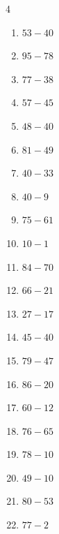 \begin{multicols}{4}
\begin{enumerate}
  \item $53-40$
        \phantom{$=13$}

  \item $95-78$
        \phantom{$=17$}

  \item $77-38$
        \phantom{$=39$}

  \item $57-45$
        \phantom{$=12$}

  \item $48-40$
        \phantom{$=8$}

\columnbreak %

  \item $81-49$
        \phantom{$=32$}

  \item $40-33$
        \phantom{$=7$}

  \item $40-9$
        \phantom{$=31$}

  \item $75-61$
        \phantom{$=14$}

  \item $10-1$
        \phantom{$=9$}

  \item $84-70$
        \phantom{$=14$}

  \item $66-21$
        \phantom{$=45$}

  \item $27-17$
        \phantom{$=10$}

  \item $45-40$
        \phantom{$=5$}

  \item $79-47$
        \phantom{$=32$}

  \item $86-20$
        \phantom{$=66$}

  \item $60-12$
        \phantom{$=48$}

  \item $76-65$
        \phantom{$=11$}

  \item $78-10$
        \phantom{$=68$}

  \item $49-10$
        \phantom{$=39$}

  \item $80-53$
        \phantom{$=27$}

  \item $77-2$
        \phantom{$=75$}


\end{enumerate}
\end{multicols}
